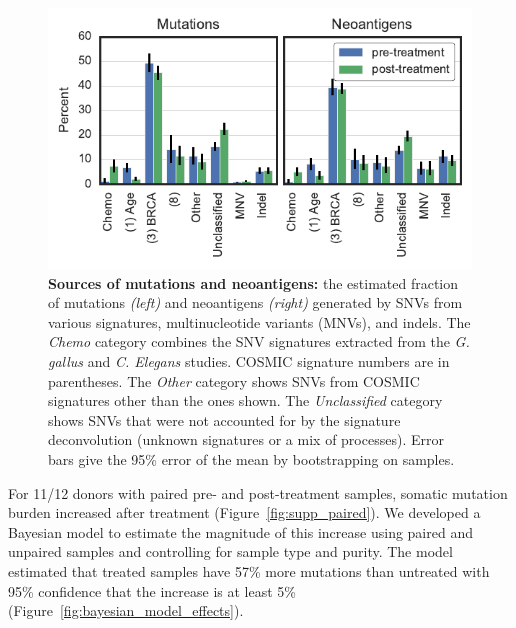 \begin{figure}[htbp]
\centering
\includegraphics[scale=1.0]{figures/sources_of_mutations_and_neoantigens.pdf}
\caption{\textbf{Sources of mutations and neoantigens:} the estimated fraction of mutations \textit{(left)} and neoantigens \textit{(right)} generated by SNVs from various signatures, multinucleotide variants (MNVs), and indels. The \textit{Chemo} category combines the SNV signatures extracted from the \textit{G. gallus} and \textit{C. Elegans} studies. COSMIC signature numbers are in parentheses. The \textit{Other} category shows SNVs from COSMIC signatures other than the ones shown. The \textit{Unclassified} category shows SNVs that were not accounted for by the signature deconvolution (unknown signatures or a mix of processes). Error bars give the 95\% error of the mean by bootstrapping on samples.}
\label{fig:sources}
\end{figure}


For 11/12 donors with paired pre- and post-treatment samples, somatic mutation burden increased after treatment (Figure~\ref{fig:supp_paired}). We developed a Bayesian model to estimate the magnitude of this increase using paired and unpaired samples and controlling for sample type and purity. The model estimated that treated samples have 57\% more mutations than untreated with 95\% confidence that the increase is at least 5\% (Figure~\ref{fig:bayesian_model_effects}).


